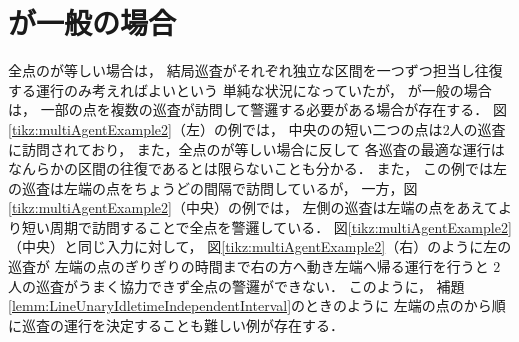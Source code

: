 \section{{\maxIdletime}が一般の場合}
\label{section:LineArbitraryIdletime}

全点の{\maxIdletime}が等しい場合は，
結局巡査がそれぞれ独立な区間を一つずつ担当し往復する運行のみ考えればよいという
単純な状況になっていたが，
{\maxIdletime}が一般の場合は，
一部の点を複数の巡査が訪問して警邏する必要がある場合が存在する．
%
図\ref{tikz:multiAgentExample2}（左）の例では，
中央の{\maxIdletime}の短い二つの点は$2$人の巡査に訪問されており，
また，全点の{\maxIdletime}が等しい場合に反して
各巡査の最適な運行はなんらかの区間の往復であるとは限らないことも分かる．
%
また，
この例では左の巡査は左端の点を{\maxIdletime}ちょうどの間隔で訪問しているが，
一方，図\ref{tikz:multiAgentExample2}（中央）の例では，
左側の巡査は左端の点をあえてより短い周期で訪問することで全点を警邏している．
図\ref{tikz:multiAgentExample2}（中央）と同じ入力に対して，
図\ref{tikz:multiAgentExample2}（右）のように左の巡査が
左端の点の{\maxIdletime}ぎりぎりの時間まで右の方へ動き左端へ帰る運行を行うと
$2$人の巡査がうまく協力できず全点の警邏ができない．
このように，
補題\ref{lemm:LineUnaryIdletimeIndependentInterval}のときのように
左端の点の{\maxIdletime}から順に巡査の運行を決定することも難しい例が存在する．

